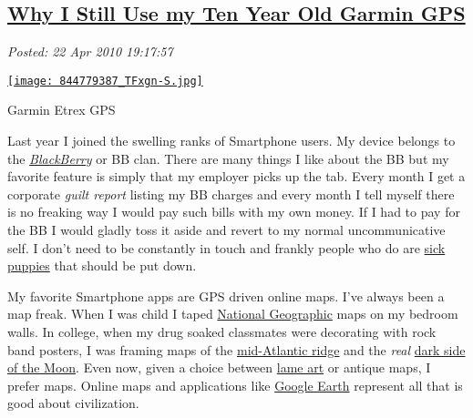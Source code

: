 %

\subsection*{\href{https://bakerjd99.wordpress.com/2010/04/22/why-i-still-use-my-ten-year-old-garmin-gps/}{Why I Still Use my Ten Year Old Garmin GPS}}


\noindent\emph{Posted: 22 Apr 2010 19:17:57}
\vspace{6pt}

\captionsetup[floatfigure]{labelformat=empty}
\begin{floatingfigure}[l]{0.30\textwidth}
\centering
\href{http://conceptcontrol.smugmug.com/Other/utilimages-1/8074217\_BQjXN\#844779387\_TFxgn-A-LB}{\texttt{[image: 844779387\_TFxgn-S.jpg]}}
\caption{Garmin  Etrex  GPS}
\label{fig:506X0}
\end{floatingfigure}Last year I joined the swelling ranks of Smartphone users. My device
belongs to the \emph{\href{http://www.blackberry.com/}{BlackBerry}} or BB
clan. There are many things I like about the BB but my favorite feature
is simply that my employer picks up the tab. Every month I get a
corporate \emph{guilt report} listing my BB charges and every month I
tell myself there is no freaking way I would pay such bills with my own
money. If I had to pay for the BB I would gladly toss it aside and
revert to my normal uncommunicative self. I don't need to be constantly
in touch and frankly people who do are
\href{http://www.sickpuppies.net/}{sick puppies} that should be put
down.




My favorite Smartphone apps are GPS driven online maps. I've always been
a map freak. When I was child I taped
\href{http://www.nationalgeographic.com/}{National Geographic} maps on
my bedroom walls. In college, when my drug soaked classmates were
decorating with rock band posters, I was framing maps of the
\href{http://en.wikipedia.org/wiki/Mid-Atlantic\_Ridge}{mid-Atlantic
ridge} and the \emph{real}
\href{http://www.wired.com/wiredscience/2007/11/the-most-beauti/}{dark
side of the Moon}. Even now, given a choice between
\href{http://brlogsbane.wordpress.com/2008/04/29/why-all-the-lame-art/}{lame
art} or antique maps, I prefer maps. Online maps and applications like
\href{http://earth.google.com/index.html}{Google Earth} represent all
that is good about civilization.

